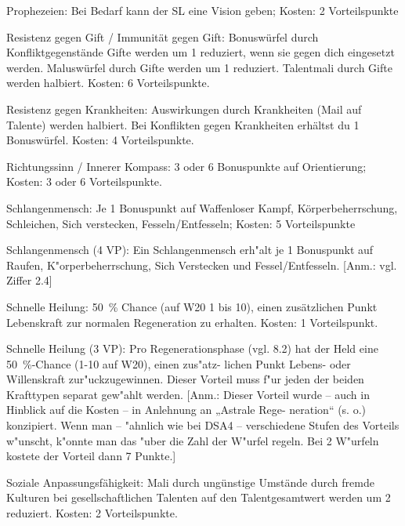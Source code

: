 \begin{description}
\item{Prophezeien:} Bei Bedarf kann der SL eine Vision geben; Kosten: 2 Vorteilspunkte

\item{Resistenz gegen Gift / Immunität gegen Gift:} Bonuswürfel durch Konfliktgegenstände Gifte werden um 1 reduziert, wenn sie gegen dich eingesetzt werden. Maluswürfel durch Gifte werden um 1 reduziert. Talentmali durch Gifte werden halbiert. Kosten: 6 Vorteilspunkte.

\item{Resistenz gegen Krankheiten:} Auswirkungen durch Krankheiten (Mail auf Talente) werden halbiert. Bei Konflikten gegen Krankheiten erhältst du 1 Bonuswürfel. Kosten: 4 Vorteilspunkte.

\item{Richtungssinn / Innerer Kompass:} 3 oder 6 Bonuspunkte auf Orientierung; Kosten: 3 oder 6 Vorteilspunkte.

\item{Schlangenmensch:} Je 1 Bonuspunkt auf Waffenloser Kampf, Körperbeherrschung, Schleichen, Sich verstecken, Fesseln/Entfesseln; Kosten: 5 Vorteilspunkte

\item{Schlangenmensch (4 VP):} Ein Schlangenmensch erh"alt je 1 Bonuspunkt auf Raufen, K"orperbeherrschung, Sich Verstecken und Fessel/Entfesseln. [Anm.: vgl. Ziffer 2.4]

\item{Schnelle Heilung:} 50~\% Chance (auf W20 1 bis 10), einen zusätzlichen Punkt Lebenskraft zur normalen Regeneration zu erhalten. Kosten: 1 Vorteilspunkt.

\item{Schnelle Heilung (3 VP):} Pro Regenerationsphase (vgl. 8.2) hat der Held eine 50~\%-Chance (1-10 auf W20), einen zus"atz- lichen Punkt Lebens- oder Willenskraft zur"uckzugewinnen. Dieser Vorteil muss f"ur jeden der beiden Krafttypen separat gew"ahlt werden. [Anm.: Dieser Vorteil wurde – auch in Hinblick auf die Kosten – in Anlehnung an „Astrale Rege- neration“ (s. o.) konzipiert. Wenn man – "ahnlich wie bei DSA4 – verschiedene Stufen des Vorteils w"unscht, k"onnte man das "uber die Zahl der W"urfel regeln. Bei 2 W"urfeln kostete der Vorteil dann 7 Punkte.]

\item{Soziale Anpassungsfähigkeit:} Mali durch ungünstige Umstände durch fremde Kulturen bei gesellschaftlichen Talenten auf den Talentgesamtwert werden um 2 reduziert. Kosten: 2 Vorteilspunkte.


\end{description}

